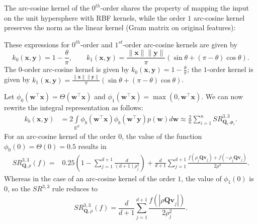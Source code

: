 The arc-cosine kernel of the $0^{th}$-order shares the property of mapping the input on the unit hypersphere with RBF kernels, while the order $1$ arc-cosine kernel preserves the norm as the linear kernel (Gram matrix on original features):

These expressions for $0^{th}$-order and $1^{st}$-order arc-cosine kernels are given by
\[
k_0(\mathbf{x},\mathbf{y}) = 1 - \frac{\theta}{\pi},\qquad k_1(\mathbf{x},\mathbf{y}) = \frac{\|\mathbf{x}\|\|\mathbf{y}\|}{\pi}(\sin\theta + (\pi - \theta)\cos\theta).
\]
The $0$-order arc-cosine kernel is given by ${k_0(\mathbf{x},\mathbf{y}) = 1 - \frac{\theta}{\pi}}$; the $1$-order kernel is given by ${k_1(\mathbf{x},\mathbf{y}) = \frac{\|\mathbf{x}\|\|\mathbf{y}\|}{\pi}(\sin\theta + (\pi - \theta)\cos\theta)}$.

Let
${\phi_0(\mathbf{w}^{\boldsymbol{\top}}\mathbf{x}) = \Theta(\mathbf{w}^{\boldsymbol{\top}}\mathbf{x})}$
and
${\phi_1(\mathbf{w}^{\boldsymbol{\top}}\mathbf{x}) = \max (0, \mathbf{w}^{\boldsymbol{\top}}\mathbf{x})}$. We can now rewrite the integral representation as follows:
\begin{align*}
k_{b}(\mathbf{x},\mathbf{y}) &= 2 \int\limits_{\mathbb{R}^d}  \phi_b(\mathbf{w}^{\boldsymbol{\top}}\mathbf{x}) \phi_b(\mathbf{w}^{\boldsymbol{\top}}\mathbf{y}) p(\mathbf{w}) d\mathbf{w} \approx \frac{2}{n} \sum\limits_{i=1}^n SR_{\mathbf{Q}_i,\boldsymbol{\rho}_i}^{3,3}.
\end{align*}
For an arc-cosine kernel of the order $0$, the value of the function $\phi_0(0) = \Theta(0) = 0.5$ results in
\begin{equation*}
\begin{split}
SR^{3,3}_{\mathbf{Q}, \rho}(f) = & 0.25 \left (1 - \sum_{j = 1}^{d + 1}\frac{d}{(d + 1)\rho_j^2} \right ) + \frac{d}{d+1}\sum\limits_{j=1}^{d+1} \frac{f(\rho_j \mathbf{Qv}_j) + f(-\rho_j \mathbf{Qv}_j)}{2\rho^2}.
\end{split}
\end{equation*}
Whereas in the case of an arc-cosine kernel of the order $1$, the value of $\phi_1(0)$ is $0$, so the $SR^{3,3}$ rule reduces to
\begin{equation*}
SR^{3,3}_{\mathbf{Q}, \rho}(f) = \frac{d}{d+1}\sum\limits_{j=1}^{d+1} \frac{f(|\rho \mathbf{Qv}_j|)}{2\rho_j^2}.
\end{equation*}